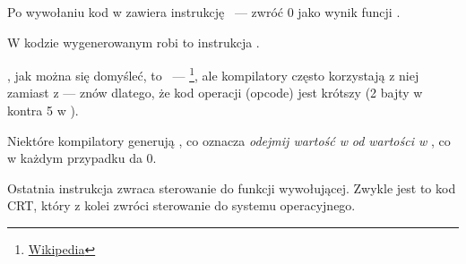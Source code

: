 Po wywołaniu \printf kod w \CCpp zawiera instrukcję ~--- zwróć 0 jako wynik funcji \main.

W kodzie wygenerowanym robi to instrukcja .


\XOR, jak można się domyśleć, to ~--- \footnote{\href{http://go.yurichev.com/17118}{Wikipedia}}, ale kompilatory często korzystają z niej zamiast z
 --- znów dlatego, że kod operacji (opcode) jest krótszy (2 bajty w \XOR kontra 5 w \MOV).

Niektóre kompilatory generują , co oznacza \emph{odejmij wartość w} \EAX \emph{od wartości w }\EAX, co w każdym przypadku da 0.

Ostatnia instrukcja \RET zwraca sterowanie do funkcji wywołującej. Zwykle jest to kod \CCpp \ac{CRT}, który z kolei zwróci sterowanie do systemu operacyjnego.

